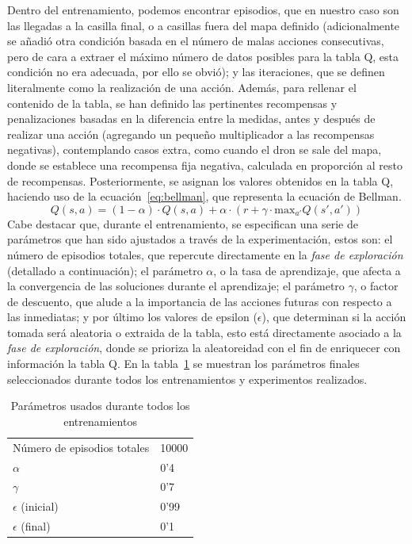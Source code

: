 Dentro del entrenamiento, podemos encontrar episodios, que en nuestro caso son las llegadas a la casilla final, o a casillas fuera del mapa definido (adicionalmente se añadió otra condición basada en el número de malas acciones consecutivas, pero de cara a extraer el máximo número de datos posibles para la tabla Q, esta condición no era adecuada, por ello se obvió); y las iteraciones, que se definen literalmente como la realización de una acción. Además, para rellenar el contenido de la tabla, se han definido las pertinentes recompensas y penalizaciones basadas en la diferencia entre la medidas, antes y después de realizar una acción (agregando un pequeño multiplicador a las recompensas negativas), contemplando casos extra, como cuando el dron se sale del mapa, donde se establece una recompensa fija negativa, calculada en proporción al resto de recompensas. Posteriormente, se asignan los valores obtenidos en la tabla Q, haciendo uso de la ecuación~\ref{eq:bellman}, que representa la ecuación de Bellman.
\begin{equation}
    Q(s, a) = (1 - \alpha) \cdot Q(s, a) + \alpha \cdot \left(r + \gamma \cdot \mathrm{max}_{a'} Q(s', a')\right)
    \label{eq:bellman}
\end{equation}
Cabe destacar que, durante el entrenamiento, se especifican una serie de parámetros que han sido ajustados a través de la experimentación, estos son: el número de episodios totales, que repercute directamente en la \emph{fase de exploración} (detallado a continuación); el parámetro $\alpha$, o la tasa de aprendizaje, que afecta a la convergencia de las soluciones durante el aprendizaje; el parámetro $\gamma$, o factor de descuento, que alude a la importancia de las acciones futuras con respecto a las inmediatas; y por último los valores de epsilon ($\epsilon$), que determinan si la acción tomada será aleatoria o extraida de la tabla, esto está directamente asociado a la \emph{fase de exploración}, donde se prioriza la aleatoreidad con el fin de enriquecer con información la tabla Q. En la tabla~\ref{table:params} se muestran los parámetros finales seleccionados durante todos los entrenamientos y experimentos realizados.\\

\begin{table} [t]
    \centering
    \begin{tabular}{ll}
    Número de episodios totales & 10000 \\
    $\alpha$                       & 0'4   \\
    $\gamma$                       & 0'7   \\
    $\epsilon$ (inicial)           & 0'99  \\
    $\epsilon$ (final)             & 0'1   \\
    \end{tabular}
    \caption[Parámetros usados durante todos los entrenamientos]{Parámetros usados durante todos los entrenamientos}
    \label{table:params}
\end{table}

